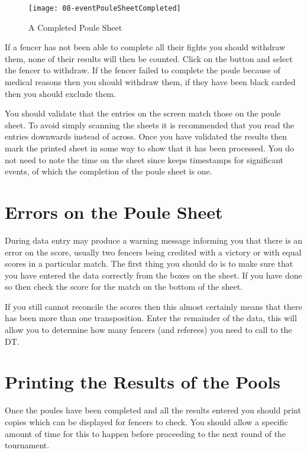 \documentclass[a4paper,11pt]{memoir}
\begin{document}
\begin{figure}[!ht]
 \centering
 \texttt{[image: 08-eventPouleSheetCompleted]}
 \caption{A Completed Poule Sheet} \label{fig:08-eventPouleSheetCompleted}
\end{figure}

If a fencer has not been able to complete all their fights you should withdraw them, none of their results will then be counted. Click on the  button and select the fencer to withdraw. If the fencer failed to complete the poule because of medical reasons then you should withdraw them, if they have been black carded then you should exclude them.

You should validate that the entries on the screen match those on the poule sheet. To avoid simply scanning the sheets it is recommended that you read the entries downwards instead of across. Once you have validated the results then mark the printed sheet in some way to show that it has been processed. You do not need to note the time on the sheet since \fencingtime{} keeps timestamps for significant events, of which the completion of the poule sheet is one.

\section{Errors on the Poule Sheet}

During data entry \fencingtime{} may produce a warning message informing you that there is an error on the score, usually two fencers being credited with a victory or with equal scores in a particular match. The first thing you should do is to make sure that you have entered the data correctly from the boxes on the sheet. If you have done so then check the score for the match on the bottom of the sheet.

If you still cannot reconcile the scores then this almost certainly means that there has been more than one transposition. Enter the remainder of the data, this will allow you to determine how many fencers (and referees) you need to call to the DT.

\section{Printing the Results of the Pools}

Once the poules have been completed and all the results entered you should print copies which can be displayed for fencers to check. You should allow a specific amount of time for this to happen before proceeding to the next round of the tournament.
\end{document}
